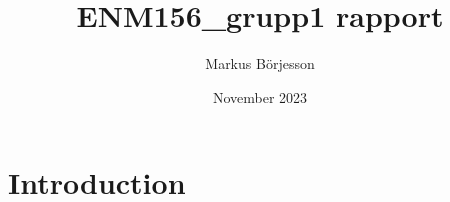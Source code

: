\documentclass{article}
\title{ENM156\_grupp1 rapport}
\author{Markus Börjesson}
\date{November 2023}
\begin{document}
\maketitle

\section{Introduction}
\end{document}

